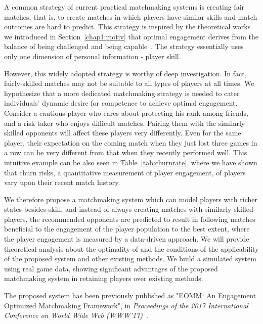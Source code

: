 A common strategy of current practical matchmaking systems is creating fair matches, that is, to create matches in which players have similar skills and match outcomes are hard to predict. This strategy is inspired by the theoretical works we introduced in Section~\ref{chap1:motiv} that optimal engagement derives from the balance of being challenged and being capable~\cite{sweetser2005gameflow,flow1990psychology,chen2007flow,graepel2006ranking}. The strategy essentially uses only one dimension of personal information - player skill. 

However, this widely adopted strategy is worthy of deep investigation. In fact, fairly-skilled matches may not be suitable to all types of players at all times. We hypothesize that a more dedicated matchmaking strategy is needed to cater individuals' dynamic desire for competence to achieve optimal engagement. Consider a cautious player who cares about protecting his rank among friends, and a risk taker who enjoys difficult matches. Pairing them with the similarly skilled opponents will affect these players very differently. Even for the same player, their expectation on the coming match when they just lost three games in a row can be very different from that when they recently performed well. This intuitive example can be also seen in Table~\ref{tab:churnrate}, where we have shown that churn risks, a quantitative measurement of player engagement, of players vary upon their recent match history. 

We therefore propose a matchmaking system which can model players with richer states besides skill, and instead of always creating matches with similarly skilled players, the recommended opponents are predicted to result in following matches beneficial to the engagement of the  player population to the best extent, where the player engagement is measured by a data-driven approach. We will provide theoretical analysis about the optimality of and the conditions of the applicability of the proposed system and other existing methods. We build a simulated system using real game data, showing significant advantages of the proposed matchmaking system in retaining players over existing methods. 

The proposed system has been previously published as "EOMM: An Engagement Optimized Matchmaking Framework", in \textit{Proceedings of the 2017 International Conference on World Wide Web (WWW'17)}~\cite{chen2017eomm}.



